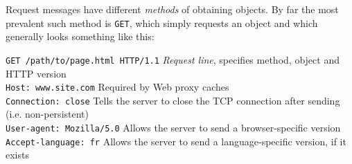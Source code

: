 \documentclass[8pt, table, xcdraw]{article}%
\begin{document}
Request messages have different \emph{methods} of obtaining objects. By far the most prevalent such method is \lstinline{GET}, which simply requests an object and which generally looks something like this:

\lstinline{GET /path/to/page.html HTTP/1.1} \emph{Request line}, specifies method, object and HTTP version\\
\lstinline{Host: www.site.com} Required by Web proxy caches\\
\lstinline{Connection: close} Tells the server to close the TCP connection after sending (i.e. non-persistent)\\
\lstinline{User-agent: Mozilla/5.0} Allows the server to send a browser-specific version\\
\lstinline{Accept-language: fr} Allows the server to send a language-specific version, if it exists
\end{document}
